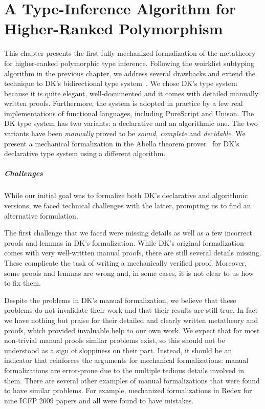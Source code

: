 \chapter{A Type-Inference Algorithm for Higher-Ranked Polymorphism}
\label{chap:ICFP}

This chapter presents the first fully mechanized formalization of the
metatheory for higher-ranked polymorphic type inference.
Following the woirklist subtyping algorithm in the previous chapter,
we address several drawbacks and extend the technique to
DK's bidirectional type system~\citep{dunfield2013complete}.
We chose DK's type system because it is
quite elegant, well-documented and it comes with detailed manually
written proofs. Furthermore, the system is adopted in practice by a few
real implementations of functional languages, including PureScript and
Unison. The DK type system has two variants: a declarative
and an algorithmic one. The two variants have been
\emph{manually} proved to be \emph{sound}, \emph{complete} and
\emph{decidable}.
We present a mechanical formalization in the Abella theorem prover~\citep{AbellaDesc} for
DK's declarative type system using a different algorithm.

\paragraph{Challenges}
While our initial goal was to formalize both DK's declarative and algorithmic
versions, we faced technical challenges with the latter, prompting us to find
an alternative formulation.

The first challenge that we faced were missing details as well as
a few incorrect proofs and lemmas in DK's formalization. While DK's
original formalization comes with very well-written manual proofs,
there are still several details missing. These complicate the task of
writing a mechanically verified proof. Moreover, some proofs and
lemmas are wrong and, in some cases, it is not clear to us how to fix them.

Despite the problems in DK's manual formalization,
we believe that these problems do not
invalidate their work and that their results are still true.
In fact we have nothing but praise for their detailed
and clearly written metatheory and proofs, which provided invaluable
help to our own work.
We expect that for most non-trivial manual
proofs similar problems exist, so this should not be understood as a sign of sloppiness
on their part. Instead, it should be an indicator that reinforces the arguments
for mechanical formalizations: manual formalizations are error-prone due to the multiple
tedious details involved in them.
There are several other examples of manual formalizations that were found to have
similar problems. For example, \citet{KleinRunYourResearch}
mechanized formalizations
in Redex for nine ICFP 2009 papers and all were found to have mistakes.

